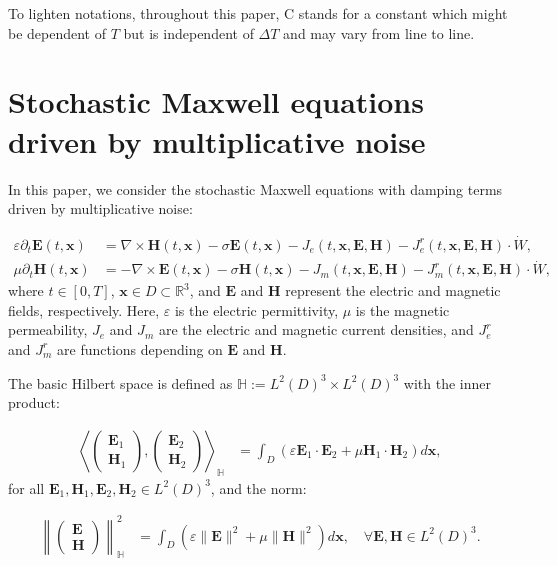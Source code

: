 \documentclass[preprint,12pt]{elsarticle}
\begin{document}
	To lighten notations, throughout this paper,  C stands for a constant which might be dependent of $T$ but is independent of $\Delta T$ and may vary from line to line.
	\section{Stochastic Maxwell equations driven by multiplicative noise} \label{sec2}
	
	In this paper, we consider the stochastic Maxwell equations with damping terms driven by multiplicative noise:
	
	\begin{align*}
		\varepsilon \partial_t \bm{E}(t,\bm{x}) &= \nabla \times \bm{H}(t,\bm{x}) - \sigma\bm{E}(t,\bm{x}) - J_e (t,\bm{x},\bm{E},\bm{H}) - J_{e}^r(t,\bm{x},\bm{E},\bm{H}) \cdot \dot{W}, \\
		\mu \partial_t \bm{H}(t,\bm{x}) &= -\nabla \times \bm{E}(t,\bm{x}) - \sigma\bm{H}(t,\bm{x}) - J_m (t,\bm{x},\bm{E},\bm{H}) - J_{m}^r(t,\bm{x},\bm{E},\bm{H}) \cdot \dot{W},
	\end{align*}
	where \( t \in [0,T] \), \( \bm{x} \in D \subset \mathbb{R}^{3} \), and \( \bm{E} \) and \( \bm{H} \) represent the electric and magnetic fields, respectively. Here, \( \varepsilon \) is the electric permittivity, \( \mu \) is the magnetic permeability, \( J_e \) and \( J_m \) are the electric and magnetic current densities, and \( J_{e}^r \) and \( J_{m}^r \) are functions depending on \( \bm{E} \) and \( \bm{H} \).
	
	The basic Hilbert space is defined as \( \mathbb{H}:= L^{2}(D)^{3} \times L^{2}(D)^{3} \) with the inner product:
	
	\begin{align*}
		\left\langle
		\begin{pmatrix}
			\bm{E}_1 \\
			\bm{H}_1
		\end{pmatrix},
		\begin{pmatrix}
			\bm{E}_2 \\
			\bm{H}_2
		\end{pmatrix}
		\right\rangle_\mathbb{H}
		&= \int_D (\varepsilon \bm{E}_1 \cdot \bm{E}_2 + \mu \bm{H}_1 \cdot \bm{H}_2) d\bm{x},
	\end{align*}
	for all \( \bm{E}_1, \bm{H}_1, \bm{E}_2, \bm{H}_2 \in L^{2}(D)^{3} \), and the norm:
	
	\begin{align*}
		\left\|
		\begin{pmatrix}
			\bm{E} \\
			\bm{H}
		\end{pmatrix}
		\right\|_\mathbb{H}^2
		&= \int_D (\varepsilon \|\bm{E}\|^2 + \mu \|\bm{H}\|^2) d\bm{x}, \quad \forall \bm{E}, \bm{H} \in L^{2}(D)^{3}.
	\end{align*}
	
\end{document}
